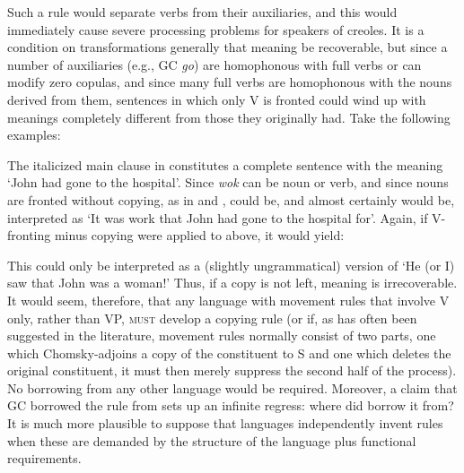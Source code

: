 Such a rule would separate verbs from their auxiliaries, and this would immediately cause severe processing problems for speakers of creoles. It is a condition on transformations generally that meaning be recoverable, but since a number of auxiliaries (e.g., GC \textit{go}) are homoph\-onous with full verbs or can modify zero copulas, and since many full verbs are homophonous with the nouns derived from them, sentences in which only V is fronted could wind up with meanings completely different from those they originally had. Take the following examples:


\z

\label{ex:2:11}\z
The italicized main clause in  constitutes a complete sentence with the meaning `John had gone to the hospital'. Since \textit{wok} can be noun or verb, and since nouns are fronted without copying, as in  and ,  could be, and almost certainly would be, interpreted as `It was work that John had gone to the hospital for'. Again, if V-fronting minus copying were applied to  above, it would yield:

\label{ex:2:12}\z
This could only be interpreted as a (slightly ungrammatical) version of `He (or I) saw that John was a woman!' Thus, if a copy is not left, meaning is irrecoverable. It would seem, therefore, that any language with movement rules that involve V only, rather than VP, \textsc{must} de\-velop a copying rule (or if, as has often been suggested in the literature, movement rules normally consist of two parts, one which Chomsky-adjoins a copy of the constituent to S and one which deletes the original constituent, it must then merely suppress the second half of the process). No borrowing from any other language would be required. Moreover, a claim that GC borrowed the rule from  sets up an infinite regress: where did  borrow it from? It is much more plausible to suppose that languages independently invent rules when these are demanded by the structure of the language plus func\-tional requirements.

